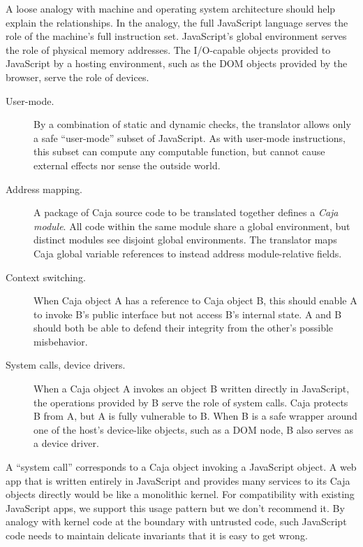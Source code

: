 \documentclass[letterpaper,twocolumn,10pt]{article}
\begin{document}
A loose analogy with machine and operating system architecture should help 
explain the relationships. In the analogy, the full JavaScript language 
serves the role of the machine's full instruction set. JavaScript's global 
environment serves the role of physical memory addresses. The I/O-capable 
objects provided to JavaScript by a hosting environment, such as the DOM 
objects provided by the browser, serve the role of devices.

\begin{description}

  \item[User-mode.] By a combination of static and dynamic checks, the 
  translator allows only a safe ``user-mode'' subset of JavaScript. As with 
  user-mode instructions, this subset can compute any computable function, 
  but cannot cause external effects nor sense the outside world.

  \item[Address mapping.] A package of Caja source code to be translated 
  together defines a \emph{Caja module}. All code within the same module 
  share a global environment, but distinct modules see disjoint global 
  environments. The translator maps Caja global variable references to 
  instead address module-relative fields.

  \item[Context switching.] When Caja object A has a reference to Caja 
  object B, this should enable A to invoke B's public interface but not 
  access B's internal state. A and B should both be able to defend their 
  integrity from the other's possible misbehavior.

  \item[System calls, device drivers.] When a Caja object A invokes an 
  object B written directly in JavaScript, the operations provided by B serve 
  the role of system calls. Caja protects B from A, but A is fully 
  vulnerable to B. When B is a safe wrapper around one of the host's 
  device-like objects, such as a DOM node, B also serves as a device driver.

\end{description}

A ``system call'' corresponds to a Caja object invoking a JavaScript object. 
A web app that is written entirely in JavaScript and provides many services 
to its Caja objects directly would be like a monolithic kernel. For 
compatibility with existing JavaScript apps, we support this usage pattern 
but we don't recommend it. By analogy with kernel code at the boundary with 
untrusted code, such JavaScript code needs to maintain delicate invariants 
that it is easy to get wrong.
\end{document}
